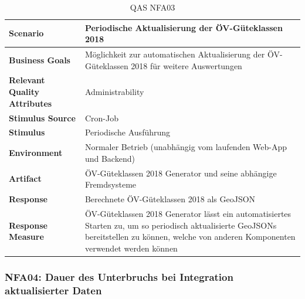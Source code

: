 \begin{table}[H]
    \begin{tabular}{l p{10.6cm}}
        \toprule
        \textbf{Scenario}
                                & Periodische Aktualisierung der ÖV-Güteklassen 2018\\
        \midrule
        \textbf{Business Goals}
                                & Möglichkeit zur automatischen Aktualisierung der ÖV-Güteklassen 2018 für weitere Auswertungen\\
        \textbf{Relevant Quality Attributes}
                                & Administrability\\
        \textbf{Stimulus Source}
                                & Cron-Job\\
        \textbf{Stimulus}
                                & Periodische Ausführung \nameref{Use Cases:UC01} \\
        \textbf{Environment}
                                & Normaler Betrieb (unabhängig vom laufenden Web-App und Backend)\\
        \textbf{Artifact}
                                & ÖV-Güteklassen 2018 Generator und seine abhängige Fremdsysteme\\
        \textbf{Response}
                                & Berechnete ÖV-Güteklassen 2018 als GeoJSON\\  
        \textbf{Response Measure}
                                & ÖV-Güteklassen 2018 Generator lässt ein automatisiertes Starten zu, um so periodisch aktualisierte GeoJSONs bereitstellen zu können, welche von anderen Komponenten verwendet werden können\\
        \bottomrule
    \end{tabular}
    \caption{QAS NFA03}
    \label{table:nfa03}
\end{table}

\subsubsection{NFA04: Dauer des Unterbruchs bei Integration aktualisierter Daten}
\label{NFA:NFA04}

